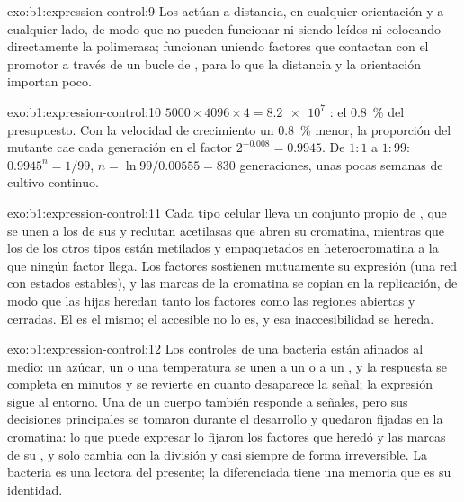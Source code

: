 \begin{solution}{exo:b1:expression-control:9}
Los  actúan a distancia, en cualquier orientación y a cualquier
lado, de modo que no pueden funcionar ni siendo leídos ni colocando
directamente la polimerasa; funcionan uniendo factores que contactan con el
promotor a través de un bucle de , para lo que la distancia y la
orientación importan poco.
\end{solution}

\begin{solution}{exo:b1:expression-control:10}
$5000\times 4096\times 4 = \num{8.2e7}$ : el \qty{0.8}{\%} del
presupuesto. Con la velocidad de crecimiento un \qty{0.8}{\%} menor, la
proporción del mutante cae cada generación en el factor $2^{-0.008} = 0.9945$. De $1:1$ a $1:99$: $0.9945^n = 1/99$, $n = \ln 99/0.00555 = 830$
generaciones, unas pocas semanas de cultivo continuo.
\end{solution}

\begin{solution}{exo:b1:expression-control:11}
Cada tipo celular lleva un conjunto propio de , que
se unen a los  de sus  y reclutan acetilasas que abren su
cromatina, mientras que los  de los otros tipos están metilados y
empaquetados en heterocromatina a la que ningún factor llega. Los factores
sostienen mutuamente su expresión (una red con estados estables), y las
marcas de la cromatina se copian en la replicación, de modo que las hijas
heredan tanto los factores como las regiones abiertas y cerradas. El 
es el mismo; el  accesible no lo es, y esa inaccesibilidad se hereda.
\end{solution}

\begin{solution}{exo:b1:expression-control:12}
Los controles de una bacteria están afinados al medio: un azúcar, un
 o una temperatura se unen a un  o a un , y la
respuesta se completa en minutos y se revierte en cuanto desaparece la
señal; la expresión sigue al entorno. Una  de un cuerpo también
responde a señales, pero sus decisiones principales se tomaron durante el
desarrollo y quedaron fijadas en la cromatina: lo que puede expresar lo
fijaron los factores que heredó y las marcas de su , y solo cambia con la
división y casi siempre de forma irreversible. La bacteria es una lectora
del presente; la  diferenciada tiene una memoria que es su identidad.
\end{solution}

